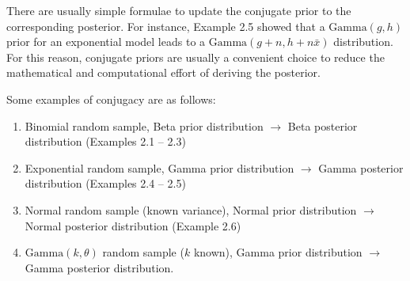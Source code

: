 There are usually simple formulae to update the conjugate prior to the corresponding posterior.
For instance, Example 2.5 showed that a $\mathrm{Gamma}(g,h)$ prior for an exponential model
leads to a $\mathrm{Gamma}(g+n,h+n\bar x)$ distribution.
For this reason, conjugate priors are usually a convenient choice to reduce the mathematical and computational effort of deriving the posterior.

Some examples of conjugacy are as follows:
\begin{enumerate}
\item Binomial random sample, Beta prior distribution
$\longrightarrow$ Beta posterior distribution (Examples 2.1 -- 2.3)
\item Exponential random sample, Gamma prior distribution
$\longrightarrow$ Gamma posterior distribution (Examples 2.4 -- 2.5)
\item Normal random sample (known variance), Normal prior distribution
$\longrightarrow$ Normal posterior distribution (Example 2.6)
\item $\mathrm{Gamma}(k,\theta)$ random sample ($k$ known), Gamma prior distribution
$\longrightarrow$ Gamma posterior distribution.
\end{enumerate}

